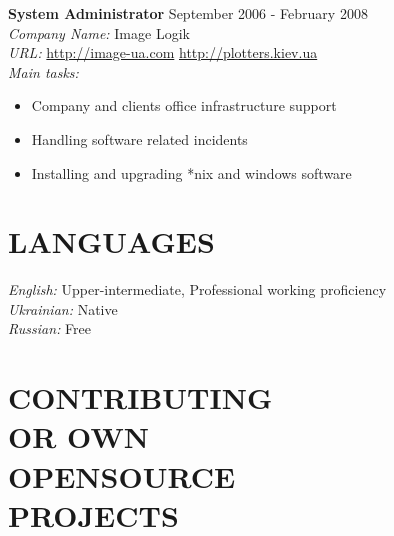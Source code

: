 \documentclass[mymargin,10pt]{res} %
\begin{document}
\begin{resume}
{\bf System Administrator} \hfill September 2006 - February 2008 \\
{\sl Company Name:} Image Logik \\
{\sl URL:} \url{http://image-ua.com} \url{http://plotters.kiev.ua} \\
{\sl Main tasks:}
\begin{itemize}
\item Company and clients office infrastructure support
\item Handling software related incidents
\item Installing and upgrading *nix and windows software
\end{itemize}



\section{LANGUAGES}

{\sl English:} Upper-intermediate, Professional working proficiency \\
{\sl Ukrainian:} Native \\
{\sl Russian:} Free \\


\section{CONTRIBUTING \\ OR OWN \\ OPENSOURCE \\ PROJECTS}


\end{resume}
\end{document}
